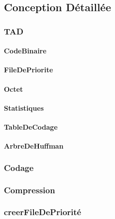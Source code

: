  \subsection{Conception Détaillée}

 \subsubsection{TAD}
 \paragraph{CodeBinaire}
 \paragraph{FileDePriorite}
 \paragraph{Octet}
 \paragraph{Statistiques}
 \paragraph{TableDeCodage}
 \paragraph{ArbreDeHuffman}
 


 \subsubsection{Codage}
 

 \subsubsection{Compression}
 

 \subsubsection{creerFileDePriorité}
 

